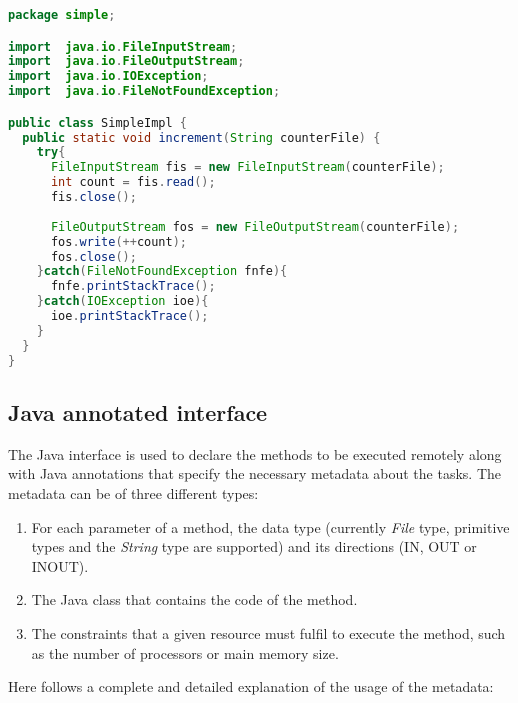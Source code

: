 \begin{lstlisting}[language=java]
package simple;

import  java.io.FileInputStream;
import  java.io.FileOutputStream;
import  java.io.IOException;
import  java.io.FileNotFoundException;

public class SimpleImpl {
  public static void increment(String counterFile) {
    try{
      FileInputStream fis = new FileInputStream(counterFile);
      int count = fis.read();
      fis.close();
      
      FileOutputStream fos = new FileOutputStream(counterFile);
      fos.write(++count);
      fos.close();
    }catch(FileNotFoundException fnfe){
      fnfe.printStackTrace();
    }catch(IOException ioe){
      ioe.printStackTrace();
    }
  }
}
\end{lstlisting}


\subsection{Java annotated interface}

The Java interface is used to declare the methods to be executed remotely along with Java annotations that
specify the necessary metadata about the tasks. The metadata can be of three different types:

\begin{enumerate}
 \item For each parameter of a method, the data type (currently {\it File} type, primitive types and the {\it String} type are supported) and its directions (IN, OUT or INOUT).
 \item The Java class that contains the code of the method.
 \item The constraints that a given resource must fulfil to execute the method, such as the number of processors or main memory size.
\end{enumerate}

Here follows a complete and detailed explanation of the usage of the metadata:

